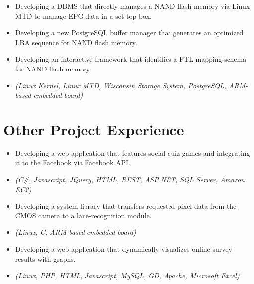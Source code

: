 \begin{itemize}
\item{Developing a DBMS that directly manages a NAND flash memory
	via Linux MTD to manage EPG data in a set-top box.}
\item{Developing a new PostgreSQL buffer manager
         that generates an optimized LBA sequence for NAND flash memory.}
\item{Developing an interactive framework that 
	identifies a FTL mapping schema for NAND flash memory.}
\item{\it\small(Linux Kernel, Linux MTD, Wisconsin Storage System, PostgreSQL,
             ARM-based embedded board)}
\end{itemize}

\section{Other Project Experience}

\begin{itemize}
     \item{Developing a web application that features social quiz games and
	     integrating it to the Facebook via Facebook API.}
     \item{\it\small(C\#, Javascript, JQuery, HTML, REST, ASP.NET, SQL Server, Amazon EC2)}
\end{itemize}

\begin{itemize}
 \item {Developing a system library that transfers requested pixel data from the CMOS camera
	 to a lane-recognition module.}
 \item{\it\small(Linux, C, ARM-based embedded board)}
\end{itemize}

  \begin{itemize}
     \item{Developing a web application that dynamically visualizes online survey results with graphs.}
     \item{\it\small(Linux, PHP, HTML, Javascript, MySQL, GD, Apache, Microsoft Excel)}
  \end{itemize}

